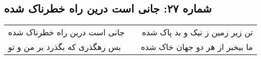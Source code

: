 \begin{center}
\section*{شماره ۲۷: جانی است درین راه خطرناک شده}
\label{sec:027}
\begin{longtable}{l p{0.5cm} r}
جانی است درین راه خطرناک شده
&&
تن زیر زمین ز نیک و بد پاک شده
\\
بس رهگذری که بگذرد بر من و تو
&&
ما بیخبر از هر دو جهان خاک شده
\\
\end{longtable}
\end{center}
